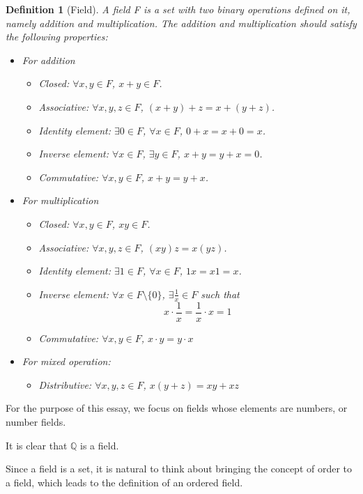 \documentclass[onecolumn]{article}
\newtheorem{definition}{Definition}[section]
\begin{document}
\begin{definition}[Field]
  A field F is a set with two binary operations defined on it, namely addition and
  multiplication. The addition and multiplication should satisfy the following
  properties:
  \begin{itemize}
    \item For addition
    \begin{itemize}
      \item Closed: $\forall x, y \in F$, $x + y \in F$.
      \item Associative: $\forall x, y, z \in F$, $(x + y) + z = x + (y + z)$.
      \item Identity element: $\exists 0 \in F$, $\forall x \in F$, $0 + x = x + 0 = x$.
      \item Inverse element: $\forall x \in F$, $\exists y \in F$, $x + y = y + x = 0$.
      \item Commutative: $\forall x, y \in F$, $x + y = y + x$.
    \end{itemize}
    \item For multiplication
    \begin{itemize}
      \item Closed: $\forall x, y \in F$, $xy \in F$.
      \item Associative: $\forall x, y, z \in F$, $(xy)z = x(yz)$.
      \item Identity element: $\exists 1 \in F$, $\forall x \in F$, $1x = x1 = x$.
      \item Inverse element: $\forall x \in F \setminus \{0\}$, $\exists \frac{1}{x} \in F$ such that
      \[
        x \cdot \frac{1}{x} = \frac{1}{x} \cdot x = 1
      \]
      \item Commutative: $\forall x, y \in F$, $x \cdot y = y \cdot x$
    \end{itemize}
    \item For mixed operation:
    \begin{itemize}
      \item Distributive: $\forall x, y, z \in F$, $x(y + z) = xy + xz$
    \end{itemize}
  \end{itemize}
\end{definition}

For the purpose of this essay, we focus on fields whose elements are numbers, or
number fields.

It is clear that $\mathbb{Q}$ is a field. 

Since a field is a set, it is natural to think about bringing the concept of 
order to a field, which leads to the definition of an ordered field.
\end{document}
